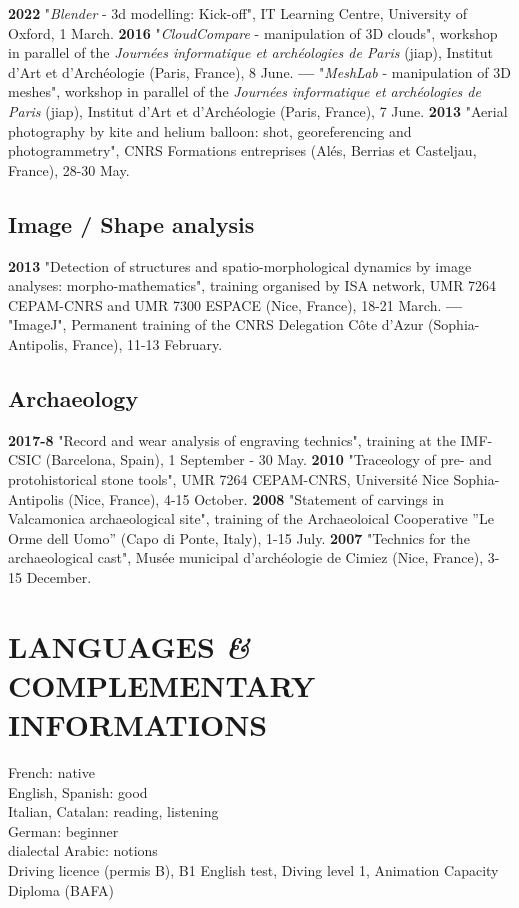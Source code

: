 \documentclass{article}
\begin{document}
\textbf{2022 }"\textit{Blender} - 3d modelling: Kick-off", IT Learning Centre, University of Oxford, 1 March.
\smallbreak
\textbf{2016 }"\textit{CloudCompare} - manipulation of 3D clouds", workshop in parallel of the \textit{Journ\'{e}es informatique et arch\'{e}ologies de Paris} (jiap), Institut d'Art et d'Arch\'{e}ologie (Paris, France), 8 June.
\smallbreak
\textbf{--- }"\textit{MeshLab }- manipulation of 3D meshes", workshop in parallel of the \textit{Journ\'{e}es informatique et arch\'{e}ologies de Paris} (jiap), Institut d'Art et d'Arch\'{e}ologie (Paris, France), 7 June.
\smallbreak
\textbf{2013 }"Aerial photography by kite and helium balloon: shot, georeferencing and photogrammetry", CNRS Formations entreprises (Al\'{e}s, Berrias et Casteljau, France), 28-30 May.

\subsection*{Image / Shape analysis}

\textbf{2013 }"Detection of structures and spatio-morphological dynamics by image analyses: morpho-mathematics", training organised by ISA network, UMR 7264 CEPAM-CNRS and UMR 7300 ESPACE (Nice, France), 18-21 March.
\smallbreak
\textbf{--- }"ImageJ", Permanent training of the CNRS Delegation C\^{o}te d'Azur (Sophia-Antipolis, France), 11-13 February.

\subsection*{Archaeology}

\textbf{2017-8 } "Record and wear analysis of engraving technics", training at the IMF-CSIC (Barcelona, Spain), 1 September - 30 May.
\smallbreak
\textbf{2010 } "Traceology of pre- and protohistorical stone tools", UMR 7264 CEPAM-CNRS, Universit\'{e} Nice Sophia-Antipolis (Nice, France), 4-15 October.
\smallbreak
\textbf{2008 } "Statement of carvings in Valcamonica archaeological site", training of the Archaeoloical Cooperative ''Le Orme dell Uomo'' (Capo di Ponte, Italy), 1-15 July.
\smallbreak
\textbf{2007 } "Technics for the archaeological cast", Mus\'{e}e municipal d'arch\'{e}ologie de Cimiez (Nice, France), 3-15 December.

\section*{LANGUAGES \textit{\&} COMPLEMENTARY INFORMATIONS}

French: native \\
English, Spanish: good \\
Italian, Catalan: reading, listening \\
German: beginner \\
dialectal Arabic: notions \\

Driving licence (permis B), B1 English test, Diving level 1, Animation Capacity Diploma (BAFA)
\end{document}
